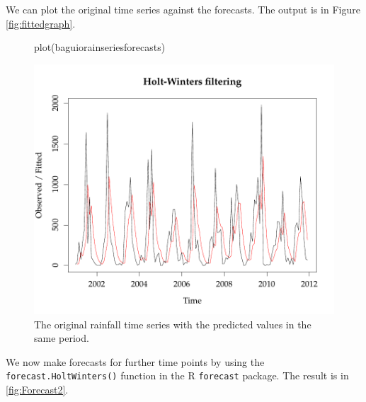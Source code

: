 \documentclass{article}\usepackage{graphicx, color}
\begin{document}
We can plot the original time series against the forecasts. The output is in Figure \eqref{fig:fittedgraph}.

\begin{figure}[!ht]
\centering
\begin{Schunk}
\begin{Sinput}
plot(baguiorainseriesforecasts)
\end{Sinput}

\includegraphics[width=.7\textwidth]{figure/listings-fittedgraph} \end{Schunk}

\caption{\label{fig:fittedgraph} The original rainfall time series with the predicted values in the same period.}
\end{figure}

We now make forecasts for further time points by using the
\texttt{forecast.HoltWinters()} function in the R \texttt{forecast} package. The result is in \eqref{fig:Forecast2}.
\end{document}
